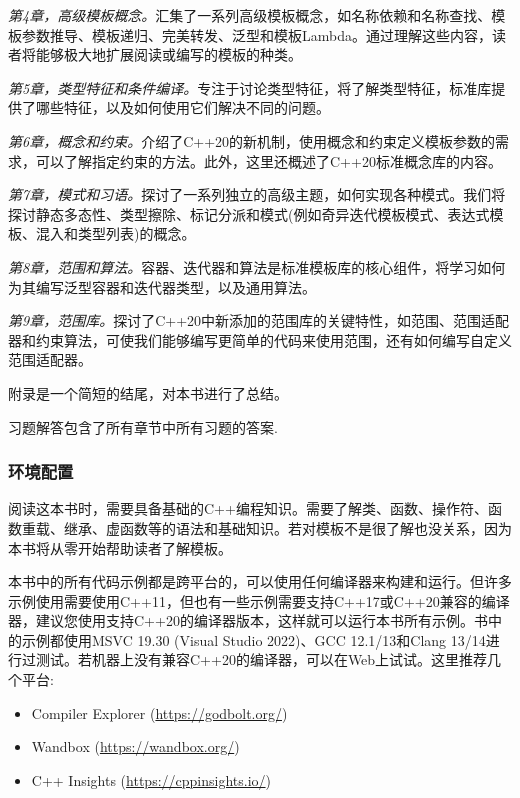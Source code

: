 \textit{第4章，高级模板概念。}汇集了一系列高级模板概念，如名称依赖和名称查找、模板参数推导、模板递归、完美转发、泛型和模板Lambda。通过理解这些内容，读者将能够极大地扩展阅读或编写的模板的种类。

\textit{第5章，类型特征和条件编译。}专注于讨论类型特征，将了解类型特征，标准库提供了哪些特征，以及如何使用它们解决不同的问题。

\textit{第6章，概念和约束。}介绍了C++20的新机制，使用概念和约束定义模板参数的需求，可以了解指定约束的方法。此外，这里还概述了C++20标准概念库的内容。

\textit{第7章，模式和习语。}探讨了一系列独立的高级主题，如何实现各种模式。我们将探讨静态多态性、类型擦除、标记分派和模式(例如奇异迭代模板模式、表达式模板、混入和类型列表)的概念。

\textit{第8章，范围和算法。}容器、迭代器和算法是标准模板库的核心组件，将学习如何为其编写泛型容器和迭代器类型，以及通用算法。

\textit{第9章，范围库。}探讨了C++20中新添加的范围库的关键特性，如范围、范围适配器和约束算法，可使我们能够编写更简单的代码来使用范围，还有如何编写自定义范围适配器。

附录是一个简短的结尾，对本书进行了总结。

习题解答包含了所有章节中所有习题的答案.

\subsubsection{环境配置}

阅读这本书时，需要具备基础的C++编程知识。需要了解类、函数、操作符、函数重载、继承、虚函数等的语法和基础知识。若对模板不是很了解也没关系，因为本书将从零开始帮助读者了解模板。

本书中的所有代码示例都是跨平台的，可以使用任何编译器来构建和运行。但许多示例使用需要使用C++11，但也有一些示例需要支持C++17或C++20兼容的编译器，建议您使用支持C++20的编译器版本，这样就可以运行本书所有示例。书中的示例都使用MSVC 19.30 (Visual Studio 2022)、GCC 12.1/13和Clang 13/14进行过测试。若机器上没有兼容C++20的编译器，可以在Web上试试。这里推荐几个平台:

\begin{itemize}
\item
Compiler Explorer (\url{https://godbolt.org/})

\item
Wandbox (\url{https://wandbox.org/})

\item
C++ Insights (\url{https://cppinsights.io/})
\end{itemize}

